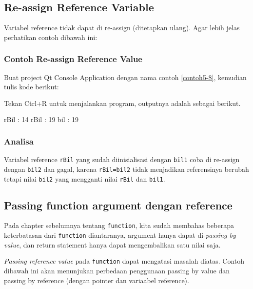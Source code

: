 \subsection{Re-assign Reference Variable}\label{re-assign-reference-variable}

Variabel reference tidak dapat di re-assign (ditetapkan ulang). Agar
lebih jelas perhatikan contoh dibawah ini:

\subsubsection*{Contoh  Re-assign Reference Value}

Buat project Qt Console Application dengan nama contoh \ref{contoh5-8}, kemudian tulis
kode berikut:



Tekan Ctrl+R untuk menjalankan program, outputnya adalah sebagai
berikut.

\begin{lcverbatim}
rBil : 14
rBil : 19
bil : 19
\end{lcverbatim}

\subsubsection*{Analisa}

Variabel reference \texttt{rBil} yang sudah diinisialisasi dengan
\texttt{bil1} coba di re-assign dengan \texttt{bil2} dan gagal, karena
\texttt{rBil=bil2} tidak menjadikan referensinya berubah tetapi nilai
\texttt{bil2} yang mengganti nilai \texttt{rBil} dan \texttt{bil1}.

\subsection{Passing function argument dengan reference}\label{passing-function-argument-dengan-reference}

Pada chapter sebelumnya tentang \texttt{function}, kita sudah membahas
beberapa keterbatasan dari \texttt{function} diantaranya, argument hanya
dapat di-\emph{passing by value}, dan return statement hanya dapat
mengembalikan satu nilai saja.

\emph{Passing reference value} pada \texttt{function} dapat mengatasi
masalah diatas. Contoh dibawah ini akan menunjukan perbedaan penggunaan
passing by value dan passing by reference (dengan pointer dan variaabel
reference).

